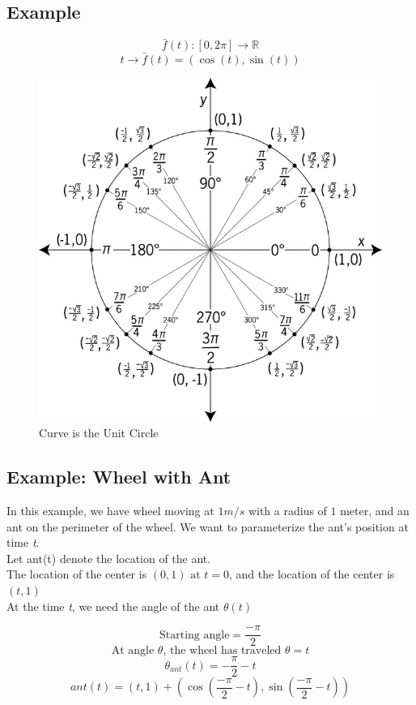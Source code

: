 \documentclass{article}
\begin{document}
\subsection*{Example}
\[\bar{f}(t): [0,2\pi]\rightarrow\mathbb{R}\]
\[t\rightarrow\bar{f}(t)=(\cos (t),\sin (t))\]
\begin{figure}[h!]
    \centering
    \includegraphics[scale=0.25]{unitCircle.jpg}
    \caption{Curve is the Unit Circle}
    \label{}
\end{figure}

\subsection*{Example: Wheel with Ant}
In this example, we have wheel moving at $1 m/s$ with a radius of $1$ meter, and an ant on the perimeter of the wheel. 
We want to parameterize the ant's position at time \textit{t}.\\[6pt]
Let ant(t) denote the location of the ant.\\
The location of the center is $(0,1) \mbox{ at }t=0 $, and the location of the center is $(t,1)$\\
At the time \textit{t}, we need the angle of the ant $\theta(t)$

\[\mbox{Starting angle}=\frac{-\pi}{2}\]
\[\mbox{At angle $\theta$, the wheel has traveled }\theta=t\]
\[\theta_{ant}(t)=-\frac{\pi}{2}-t\]
\[ant(t)=(t,1)+(\cos(\frac{-\pi}{2}-t),\sin(\frac{-\pi}{2}-t))\]
\end{document}
